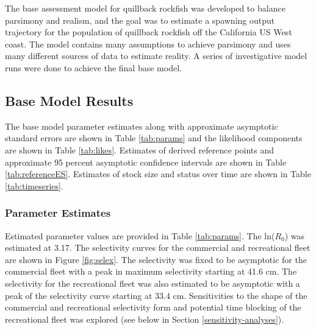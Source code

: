 \documentclass[11pt,
  english,
  a4paper,
]{article}
\begin{document}
\leavevmode\tagmcend\tagstructend


The base assessment model for quillback rockfish was developed to balance parsimony and realism, and the goal was to estimate a spawning output trajectory for the population of quillback rockfish off the California US West coast. The model contains many assumptions to achieve parsimony and uses many different sources of data to estimate reality. A series of investigative model runs were done to achieve the final base model.

\leavevmode\tagmcend\tagstructend\par


\hypertarget{base-model-results}{%
\subsection{Base Model Results}\label{base-model-results}}

\leavevmode\tagmcend\tagstructend


The base model parameter estimates along with approximate asymptotic standard errors are shown in Table \ref{tab:params} and the likelihood components are shown in Table \ref{tab:likes}. Estimates of derived reference points and approximate 95 percent asymptotic confidence intervals are shown in Table \ref{tab:referenceES}. Estimates of stock size and status over time are shown in Table \ref{tab:timeseries}.

\leavevmode\tagmcend\tagstructend\par


\hypertarget{parameter-estimates}{%
\subsubsection{Parameter Estimates}\label{parameter-estimates}}

\leavevmode\tagmcend\tagstructend


Estimated parameter values are provided in Table \ref{tab:params}. The ln({\(R_0\)\leavevmode\tagmcend\tagstructend}) was estimated at 3.17. The selectivity curves for the commercial and recreational fleet are shown in Figure \ref{fig:selex}. The selectivity was fixed to be asymptotic for the commercial fleet with a peak in maximum selectivity starting at 41.6 cm. The selectivity for the recreational fleet was also estimated to be asymptotic with a peak of the selectivity curve starting at 33.4 cm. Sensitivities to the shape of the commercial and recreational selectivity form and potential time blocking of the recreational fleet was explored (see below in Section \ref{sensitivity-analyses}).
\end{document}
